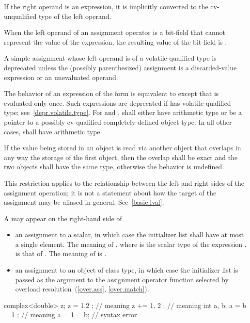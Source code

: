 \pnum
{}%
If the right operand is an expression, it is implicitly
converted to the cv-unqualified type of the left
operand.

\pnum
{}%
When the left operand of an assignment operator
is a bit-field that cannot represent the value of the expression, the
resulting value of the bit-field is
.

\pnum
A simple assignment whose left operand is of
a volatile-qualified type is deprecated
unless the (possibly parenthesized) assignment is a discarded-value expression or
an unevaluated operand.

\pnum
The behavior of an expression of the form 
is equivalent to  except
that  is evaluated only once.
Such expressions are deprecated
if  has volatile-qualified type; see~\ref{depr.volatile.type}.
For \tcode{+=} and \tcode{-=},
 shall either have arithmetic type or be a pointer to a
possibly cv-qualified completely-defined object type. In all other
cases,  shall have arithmetic type.

\pnum
If the value being stored in an object is read via another object that
overlaps in any way the storage of the first object, then the overlap shall be
exact and the two objects shall have the same type, otherwise the behavior is
undefined.
\begin{note}
This restriction applies to the relationship
between the left and right sides of the assignment operation; it is not a
statement about how the target of the assignment may be aliased in general.
See~\ref{basic.lval}.
\end{note}

\pnum
A  may appear on the right-hand side of
\begin{itemize}
\item an assignment to a scalar, in which case the initializer list shall have
at most a single element. The meaning of , where  is the
scalar type of the expression , is that of . The meaning of
 is .

\item an assignment to an object of class type, in which case the initializer
list is passed as the argument to the assignment operator function selected by
overload resolution~(\ref{over.ass}, \ref{over.match}).
\end{itemize}
\begin{example}
\begin{codeblock}
complex<double> z;
z = { 1,2 };        // meaning 
z += { 1, 2 };      // meaning 
int a, b;
a = b = { 1 };      // meaning 
a = { 1 } = b;      // syntax error
\end{codeblock}
\end{example}

